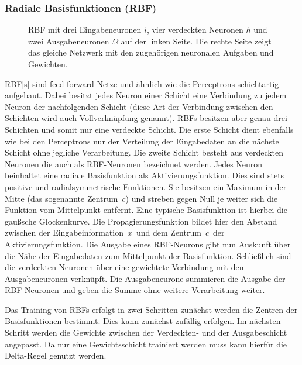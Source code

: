 \subsubsection{Radiale Basisfunktionen (RBF)}
\begin{figure}[!htb]
    \centering
        
    \caption[Darstellung eines RBF]{RBF mit drei Eingabeneuronen $i$, vier verdeckten Neuronen $h$  und zwei Ausgabeneuronen $\Omega$ auf der linken Seite. Die rechte Seite zeigt das gleiche Netzwerk mit den zugehörigen neuronalen Aufgaben und Gewichten.}
    \label{fig:RBF}
\end{figure}

\gls{RBF}[s] sind feed-forward Netze und ähnlich wie die Perceptrons schichtartig aufgebaut. Dabei besitzt jedes Neuron einer Schicht eine Verbindung zu jedem Neuron der nachfolgenden Schicht (diese Art der Verbindung zwischen den Schichten wird auch Vollverknüpfung genannt). RBFs besitzen aber genau drei Schichten und somit nur eine verdeckte Schicht. Die erste Schicht dient ebenfalls wie bei den Perceptrons nur der Verteilung der Eingabedaten an die nächste Schicht ohne jegliche Verarbeitung. Die zweite Schicht besteht aus verdeckten Neuronen die auch als RBF-Neuronen  bezeichnet werden. Jedes Neuron beinhaltet eine radiale Basisfunktion als Aktivierungsfunktion. Dies sind stets positive und radialsymmetrische Funktionen. Sie besitzen ein Maximum in der Mitte (das sogenannte Zentrum~$c$) und streben gegen Null je weiter sich die Funktion vom Mittelpunkt entfernt. Eine typische Basisfunktion ist hierbei die gaußsche Glockenkurve. Die Propagierungsfunktion bildet hier den Abstand zwischen der Eingabeinformation~$x$~und dem Zentrum~$c$~der Aktivierungsfunktion. Die Ausgabe eines RBF-Neurons gibt nun Auskunft über die Nähe der Eingabedaten zum Mittelpunkt der Basisfunktion. Schließlich sind die verdeckten Neuronen über eine gewichtete Verbindung mit den Ausgabeneuronen  verknüpft. Die Ausgabeneurone summieren die Ausgabe der RBF-Neuronen und geben die Summe ohne weitere Verarbeitung weiter. 

Das Training von RBFs erfolgt in zwei Schritten zunächst werden die Zentren der Basisfunktionen bestimmt. Dies kann zunächst zufällig erfolgen. Im nächsten Schritt werden die Gewichte zwischen der Verdeckten- und der Ausgabeschicht angepasst. Da nur eine Gewichtsschicht trainiert werden muss kann hierfür die Delta-Regel genutzt werden.

